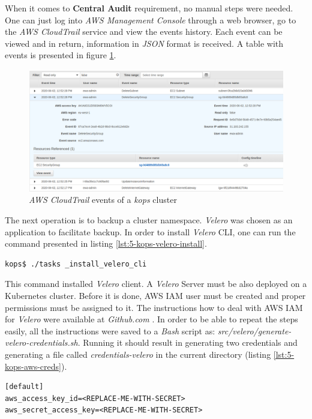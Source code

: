 When it comes to \textbf{Central Audit} requirement, no manual steps were needed. One can just log into \textit{AWS Management Console} through a web browser, go to the \textit{AWS CloudTrail} service and view the events history. Each event can be viewed and in return, information in \textit{JSON} format is received. A table with events is presented in figure \ref{fig:kops-cloudtrail}.

\begin{figure}[H]
    \centering
    \includegraphics[width=15cm]{figures/kops-cloudtrail.png}
    \captionsetup{justification=centering,margin=2cm}
    \caption{\textit{AWS CloudTrail} events of a \textit{kops} cluster}
    \label{fig:kops-cloudtrail}
\end{figure}

The next operation is to backup a cluster namespace. \textit{Velero} was chosen as an application to facilitate backup. In order to install \textit{Velero} CLI, one can run the command presented in listing \ref{lst:5-kops-velero-install}.
\begin{lstlisting}[basicstyle=\scriptsize,xleftmargin=0cm,label=lst:5-kops-velero-install,caption={Automated command to install \textit{Velero} CLI},captionpos=b,language=Bash]
kops$ ./tasks _install_velero_cli
\end{lstlisting}

This command installed \textit{Velero} client. A \textit{Velero} Server must be also deployed on a Kubernetes cluster. Before it is done, AWS IAM user must be created and proper permissions must be assigned to it. The instructions how to deal with AWS IAM for \textit{Velero} were available at \textit{Github.com} \cite{velero-aws-plugin}. In order to be able to repeat the steps easily, all the instructions were saved to a \textit{Bash} script as: \textit{src/velero/generate-velero-credentials.sh}. Running it should result in generating two credentials and generating a file called \textit{credentials-velero} in the current directory (listing \ref{lst:5-kops-aws-creds}).
\begin{lstlisting}[basicstyle=\scriptsize,xleftmargin=0cm,label=lst:5-kops-aws-creds,caption={Contents of AWS credentials file}]
[default]
aws_access_key_id=<REPLACE-ME-WITH-SECRET>
aws_secret_access_key=<REPLACE-ME-WITH-SECRET>
\end{lstlisting}

